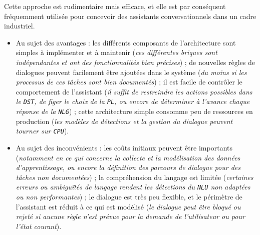 			
			Cette approche est rudimentaire mais efficace, et elle est par conséquent fréquemment utilisée pour concevoir des assistants conversationnels dans un cadre industriel.
			\begin{itemize}
				\item[\faThumbsUp] Au sujet des avantages :
					les différents composants de l'architecture sont simples à implémenter et à maintenir
					(\textit{ces différentes briques sont indépendantes et ont des fonctionnalités bien précises}) ;
					de nouvelles règles de dialogues peuvent facilement être ajoutées dans le système
					(\textit{du moins si les processus de ces tâches sont bien documentés}) ;
					il est facile de contrôler le comportement de l'assistant
					(\textit{il suffit de restreindre les actions possibles dans le \texttt{DST}, de figer le choix de la \texttt{PL}, ou encore de déterminer à l'avance chaque réponse de la \texttt{NLG}}) ;
					cette architecture simple consomme peu de ressources en production (\textit{les modèles de détections et la gestion du dialogue peuvent tourner sur \texttt{CPU}}).
				\item[\faThumbsDown] Au sujet des inconvénients :
					les coûts initiaux peuvent être importants (\textit{notamment en ce qui concerne la collecte et la modélisation des données d'apprentissage, ou encore la définition des parcours de dialogue pour des tâches non documentées}) ;
					la compréhension du langage est limitée (\textit{certaines erreurs ou ambiguïtés de langage rendent les détections du \texttt{NLU} non adaptées ou non performantes}) ;
					le dialogue est très peu flexible, et le périmètre de l'assistant est réduit à ce qui est modélisé (\textit{le dialogue peut être bloqué ou rejeté si aucune règle n'est prévue pour la demande de l'utilisateur ou pour l'état courant}).
			\end{itemize}
			
			\newpage
			
